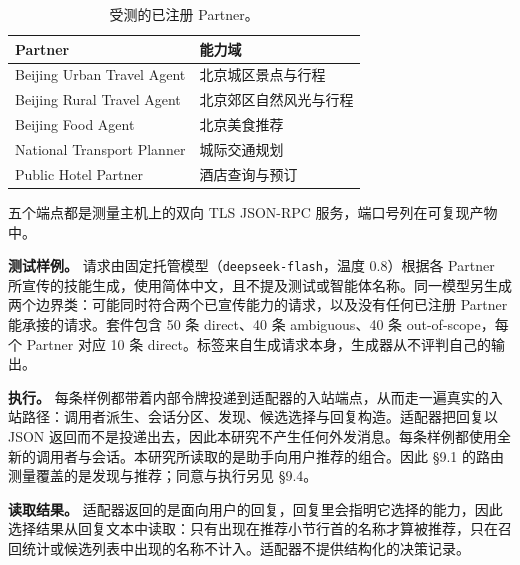 \documentclass[11pt,a4paper]{article}
\begin{document}
\begin{table}[htbp]

\centering

\small

\caption{受测的已注册 Partner。}\label{tab:3}

\begin{tabularx}{\textwidth}{@{}*{2}{X}@{}}

\toprule

\textbf{Partner} & \textbf{能力域} \\

\midrule

Beijing Urban Travel Agent & 北京城区景点与行程 \\

Beijing Rural Travel Agent & 北京郊区自然风光与行程 \\

Beijing Food Agent & 北京美食推荐 \\

National Transport Planner & 城际交通规划 \\

Public Hotel Partner & 酒店查询与预订 \\

\bottomrule

\end{tabularx}

\end{table}

五个端点都是测量主机上的双向 TLS JSON-RPC 服务，端口号列在可复现产物中。

\textbf{测试样例。} 请求由固定托管模型（\texttt{deepseek-flash}，温度 0.8）根据各 Partner 所宣传的技能生成，使用简体中文，且不提及测试或智能体名称。同一模型另生成两个边界类：可能同时符合两个已宣传能力的请求，以及没有任何已注册 Partner 能承接的请求。套件包含 50 条 direct、40 条 ambiguous、40 条 out-of-scope，每个 Partner 对应 10 条 direct。标签来自生成请求本身，生成器从不评判自己的输出。

\textbf{执行。} 每条样例都带着内部令牌投递到适配器的入站端点，从而走一遍真实的入站路径：调用者派生、会话分区、发现、候选选择与回复构造。适配器把回复以 JSON 返回而不是投递出去，因此本研究不产生任何外发消息。每条样例都使用全新的调用者与会话。本研究所读取的是助手向用户推荐的组合。因此 §9.1 的路由测量覆盖的是发现与推荐；同意与执行另见 §9.4。

\textbf{读取结果。} 适配器返回的是面向用户的回复，回复里会指明它选择的能力，因此选择结果从回复文本中读取：只有出现在推荐小节行首的名称才算被推荐，只在召回统计或候选列表中出现的名称不计入。适配器不提供结构化的决策记录。
\end{document}
